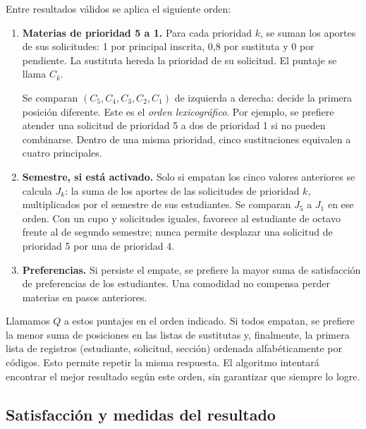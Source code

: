 Entre resultados válidos se aplica el siguiente orden:
\begin{enumerate}
\item \textbf{Materias de prioridad 5 a 1.} Para cada prioridad $k$, se suman los aportes de sus solicitudes: 1 por principal inscrita, 0,8 por sustituta y 0 por pendiente. La sustituta hereda la prioridad de su solicitud. El puntaje se llama $C_k$.

Se comparan $(C_5,C_4,C_3,C_2,C_1)$ de izquierda a derecha: decide la primera posición diferente. Este es el \emph{orden lexicográfico}. Por ejemplo, se prefiere atender una solicitud de prioridad 5 a dos de prioridad 1 si no pueden combinarse. Dentro de una misma prioridad, cinco sustituciones equivalen a cuatro principales.
\item \textbf{Semestre, si está activado.} Solo si empatan los cinco valores anteriores se calcula $J_k$: la suma de los aportes de las solicitudes de prioridad $k$, multiplicados por el semestre de sus estudiantes. Se comparan $J_5$ a $J_1$ en ese orden. Con un cupo y solicitudes iguales, favorece al estudiante de octavo frente al de segundo semestre; nunca permite desplazar una solicitud de prioridad 5 por una de prioridad 4.
\item \textbf{Preferencias.} Si persiste el empate, se prefiere la mayor suma de satisfacción de preferencias de los estudiantes. Una comodidad no compensa perder materias en pasos anteriores.
\end{enumerate}

Llamamos $Q$ a estos puntajes en el orden indicado. Si todos empatan, se prefiere la menor suma de posiciones en las listas de sustitutas y, finalmente, la primera lista de registros (estudiante, solicitud, sección) ordenada alfabéticamente por códigos. Esto permite repetir la misma respuesta. El algoritmo intentará encontrar el mejor resultado según este orden, sin garantizar que siempre lo logre.

\subsection{Satisfacción y medidas del resultado}\label{sec:metricas}

